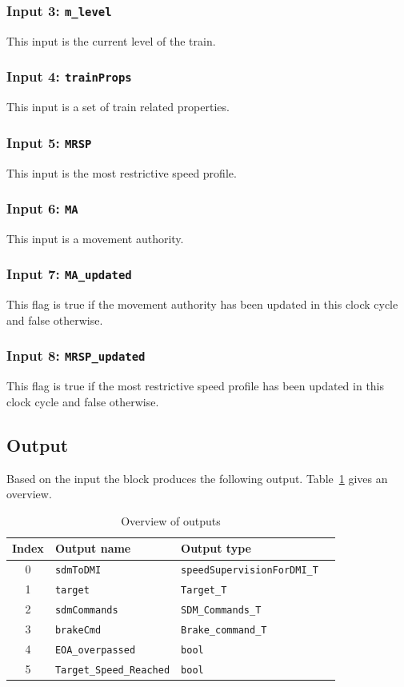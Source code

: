 \subsubsection{Input 3: \texttt{m\_level}}
This input is the current level of the train.
\subsubsection{Input 4: \texttt{trainProps}}
This input is a set of train related properties.
\subsubsection{Input 5: \texttt{MRSP}}
This input is the most restrictive speed profile.
\subsubsection{Input 6: \texttt{MA}}
This input is a movement authority.
\subsubsection{Input 7: \texttt{MA\_updated}}
This flag is true if the movement authority has been updated in this clock cycle and false otherwise.
\subsubsection{Input 8: \texttt{MRSP\_updated}}
This flag is true if the most restrictive speed profile has been updated in this clock cycle and false otherwise.



\subsection{Output}
Based on the input the block produces the following output. Table~\ref{tbl:speedsupervisionOutput} gives an overview.

\begin{table}[H]
  \begin{tabular}{| c | l | l | l |}
    \hline
    \textbf{Index} & \textbf{Output name} & \textbf{Output type}\\ \hline
    0 & \texttt{sdmToDMI} & \texttt{speedSupervisionForDMI\_T}\\
    1 & \texttt{target} & \texttt{Target\_T}\\
    2 & \texttt{sdmCommands} & \texttt{SDM\_Commands\_T}\\
    3 & \texttt{brakeCmd} & \texttt{Brake\_command\_T}\\
    4 & \texttt{EOA\_overpassed} & \texttt{bool}\\
    5 & \texttt{Target\_Speed\_Reached} & \texttt{bool}\\
    \hline
  \end{tabular} 
  \caption{Overview of outputs}
  \label{tbl:speedsupervisionOutput}
\end{table}

